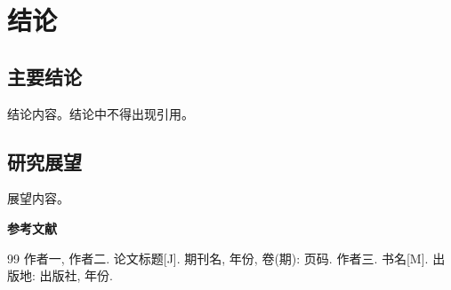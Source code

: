 \documentclass[12pt,a4paper]{ctexart}
\begin{document}
\section{结论}
\subsection{主要结论}
结论内容。结论中不得出现引用。

\subsection{研究展望}
展望内容。

\renewcommand{\refname}{}
\begin{center}
    {\bfseries 参考文献}
\end{center}
\vspace{12bp}
\begin{thebibliography}{99}
 作者一, 作者二. 论文标题[J]. 期刊名, 年份, 卷(期): 页码.
 作者三. 书名[M]. 出版地: 出版社, 年份.
\end{thebibliography}
\end{document}
